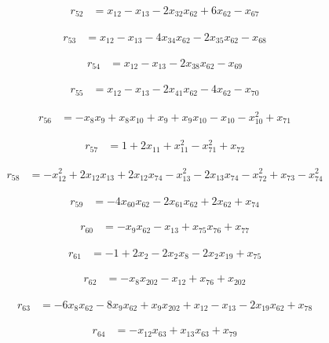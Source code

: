 \begin{align*}
r_{52}&=x_{12}-x_{13}-2x_{32}x_{62}+6x_{62}-x_{67}
\end{align*}

\begin{align*}
r_{53}&=x_{12}-x_{13}-4x_{34}x_{62}-2x_{35}x_{62}-x_{68}
\end{align*}

\begin{align*}
r_{54}&=x_{12}-x_{13}-2x_{38}x_{62}-x_{69}
\end{align*}

\begin{align*}
r_{55}&=x_{12}-x_{13}-2x_{41}x_{62}-4x_{62}-x_{70}
\end{align*}

\begin{align*}
r_{56}&=-x_{8}x_{9}+x_{8}x_{10}+x_{9}+x_{9}x_{10}-x_{10}-x_{10}^{2}+x_{71}
\end{align*}

\begin{align*}
r_{57}&=1+2x_{11}+x_{11}^{2}-x_{71}^{2}+x_{72}
\end{align*}

\begin{align*}
r_{58}&=-x_{12}^{2}+2x_{12}x_{13}+2x_{12}x_{74}-x_{13}^{2}-2x_{13}x_{74}-x_{72}^{2}+x_{73}-x_{74}^{2}
\end{align*}

\begin{align*}
r_{59}&=-4x_{60}x_{62}-2x_{61}x_{62}+2x_{62}+x_{74}
\end{align*}

\begin{align*}
r_{60}&=-x_{9}x_{62}-x_{13}+x_{75}x_{76}+x_{77}
\end{align*}

\begin{align*}
r_{61}&=-1+2x_{2}-2x_{2}x_{8}-2x_{2}x_{19}+x_{75}
\end{align*}

\begin{align*}
r_{62}&=-x_{8}x_{202}-x_{12}+x_{76}+x_{202}
\end{align*}

\begin{align*}
r_{63}&=-6x_{8}x_{62}-8x_{9}x_{62}+x_{9}x_{202}+x_{12}-x_{13}-2x_{19}x_{62}+x_{78}
\end{align*}

\begin{align*}
r_{64}&=-x_{12}x_{63}+x_{13}x_{63}+x_{79}
\end{align*}

